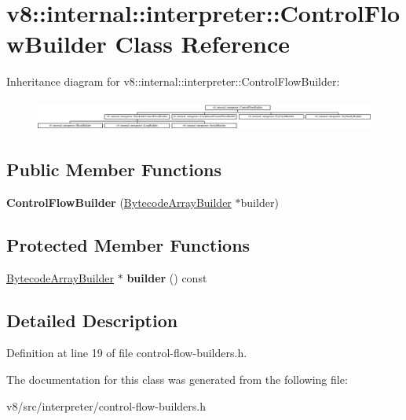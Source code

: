 \hypertarget{classv8_1_1internal_1_1interpreter_1_1ControlFlowBuilder}{}\section{v8\+:\+:internal\+:\+:interpreter\+:\+:Control\+Flow\+Builder Class Reference}
\label{classv8_1_1internal_1_1interpreter_1_1ControlFlowBuilder}
Inheritance diagram for v8\+:\+:internal\+:\+:interpreter\+:\+:Control\+Flow\+Builder\+:\begin{figure}[H]
\begin{center}
\leavevmode
\includegraphics[height=1.037037cm]{classv8_1_1internal_1_1interpreter_1_1ControlFlowBuilder}
\end{center}
\end{figure}
\subsection*{Public Member Functions}
\begin{DoxyCompactItemize}
\item 
\mbox{\label{classv8_1_1internal_1_1interpreter_1_1ControlFlowBuilder_aa9d745ac57c08909a28db13e33a413f1}} 
{\bfseries Control\+Flow\+Builder} (\mbox{\hyperlink{classv8_1_1internal_1_1interpreter_1_1BytecodeArrayBuilder}{Bytecode\+Array\+Builder}} $\ast$builder)
\end{DoxyCompactItemize}
\subsection*{Protected Member Functions}
\begin{DoxyCompactItemize}
\item 
\mbox{\label{classv8_1_1internal_1_1interpreter_1_1ControlFlowBuilder_aec6054cdfe153480937866f55f2dff34}} 
\mbox{\hyperlink{classv8_1_1internal_1_1interpreter_1_1BytecodeArrayBuilder}{Bytecode\+Array\+Builder}} $\ast$ {\bfseries builder} () const
\end{DoxyCompactItemize}


\subsection{Detailed Description}


Definition at line 19 of file control-\/flow-\/builders.\+h.



The documentation for this class was generated from the following file\+:\begin{DoxyCompactItemize}
\item 
v8/src/interpreter/control-\/flow-\/builders.\+h\end{DoxyCompactItemize}

